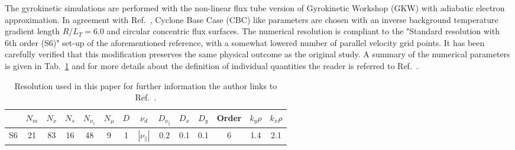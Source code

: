\documentclass[aip, amsmath, amssymb, reprint, twocolumn, floatfix]{revtex4-1}
\newcommand{\rlt}{R/L_T}
\begin{document}
The gyrokinetic simulations are performed with the non-linear flux tube version of Gyrokinetic Workshop (GKW) \cite{Peeters2009} with adiabatic electron approximation.
In agreement with Ref.~, Cyclone Base Case (CBC) like parameters are chosen with an inverse background temperature gradient length $\rlt = 6.0$ and circular concentric flux surfaces. 
The numerical resolution is compliant to the "Standard resolution with 6th order (S6)" set-up of the aforementioned reference, with a somewhat lowered number of parallel velocity grid points.
It has been carefully verified that this modification preserves the same physical outcome as the original study.
A summary of the numerical parameters is given in Tab.~\ref{tab:resolution} and for more details about the definition of individual quantities the reader is referred to Ref.~.
\begin{table}[ht]
	\begin{ruledtabular}
		\begin{tabular}{l | ccccc | ccccc | c | cc}
			& $N_m$ & $N_x$ & $N_s$ & $N_{\nu_\parallel}$ & $N_\mu$ & $D$ & $\nu_d$           & $D_{\nu_\parallel}$ & $D_x$ & $D_y$ & Order & $k_y\rho$ & $k_x\rho$ \\
			\hline
			S6   & 21    & 83    & 16    & 48                  & 9       & 1   & $|\nu_\parallel|$ & 0.2                 & 0.1   & 0.1   & 6     & 1.4       & 2.1       \\
		\end{tabular}
	\end{ruledtabular}
	\caption{
		Resolution used in this paper for further information the author links to Ref.~. %
	}
	\label{tab:resolution}
\end{table}

\end{document}
